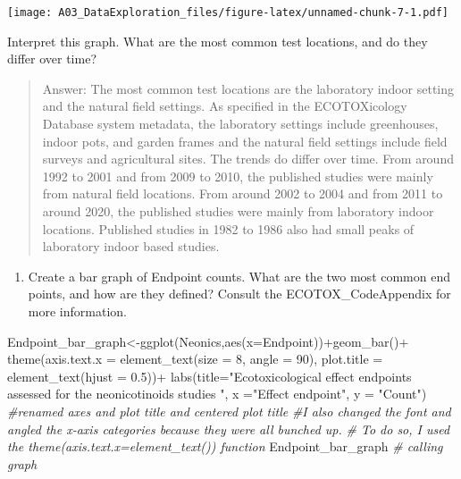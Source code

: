 \documentclass[
]{article}
\newenvironment{Shaded}{\begin{snugshade}}{\end{snugshade}}
\newcommand{\AttributeTok}[1]{\textcolor[rgb]{0.77,0.63,0.00}{#1}}
\newcommand{\CommentTok}[1]{\textcolor[rgb]{0.56,0.35,0.01}{\textit{#1}}}
\newcommand{\DecValTok}[1]{\textcolor[rgb]{0.00,0.00,0.81}{#1}}
\newcommand{\FloatTok}[1]{\textcolor[rgb]{0.00,0.00,0.81}{#1}}
\newcommand{\FunctionTok}[1]{\textcolor[rgb]{0.00,0.00,0.00}{#1}}
\newcommand{\NormalTok}[1]{#1}
\newcommand{\OtherTok}[1]{\textcolor[rgb]{0.56,0.35,0.01}{#1}}
\newcommand{\SpecialCharTok}[1]{\textcolor[rgb]{0.00,0.00,0.00}{#1}}
\newcommand{\StringTok}[1]{\textcolor[rgb]{0.31,0.60,0.02}{#1}}
\providecommand{\tightlist}{%
  \setlength{\itemsep}{0pt}\setlength{\parskip}{0pt}}
\begin{document}
\texttt{[image: A03\_DataExploration\_files/figure-latex/unnamed-chunk-7-1.pdf]}

Interpret this graph. What are the most common test locations, and do
they differ over time?

\begin{quote}
Answer: The most common test locations are the laboratory indoor setting
and the natural field settings. As specified in the ECOTOXicology
Database system metadata, the laboratory settings include greenhouses,
indoor pots, and garden frames and the natural field settings include
field surveys and agricultural sites. The trends do differ over time.
From around 1992 to 2001 and from 2009 to 2010, the published studies
were mainly from natural field locations. From around 2002 to 2004 and
from 2011 to around 2020, the published studies were mainly from
laboratory indoor locations. Published studies in 1982 to 1986 also had
small peaks of laboratory indoor based studies.
\end{quote}

\begin{enumerate}
\def\labelenumi{\arabic{enumi}.}
\setcounter{enumi}{10}
\tightlist
\item
  Create a bar graph of Endpoint counts. What are the two most common
  end points, and how are they defined? Consult the ECOTOX\_CodeAppendix
  for more information.
\end{enumerate}

\begin{Shaded}
\begin{Highlighting}[]
\NormalTok{Endpoint\_bar\_graph}\OtherTok{\textless{}{-}}\FunctionTok{ggplot}\NormalTok{(Neonics,}\FunctionTok{aes}\NormalTok{(}\AttributeTok{x=}\NormalTok{Endpoint))}\SpecialCharTok{+}\FunctionTok{geom\_bar}\NormalTok{()}\SpecialCharTok{+}
  \FunctionTok{theme}\NormalTok{(}\AttributeTok{axis.text.x =} \FunctionTok{element\_text}\NormalTok{(}\AttributeTok{size =} \DecValTok{8}\NormalTok{, }\AttributeTok{angle =} \DecValTok{90}\NormalTok{),}
        \AttributeTok{plot.title =} \FunctionTok{element\_text}\NormalTok{(}\AttributeTok{hjust =} \FloatTok{0.5}\NormalTok{))}\SpecialCharTok{+}
  \FunctionTok{labs}\NormalTok{(}\AttributeTok{title=}\StringTok{"Ecotoxicological effect endpoints assessed for the neonicotinoids studies "}\NormalTok{,}
  \AttributeTok{x =}\StringTok{"Effect endpoint"}\NormalTok{, }\AttributeTok{y =} \StringTok{"Count"}\NormalTok{)}
\CommentTok{\#renamed axes and plot title and centered plot title}
\CommentTok{\#I also changed the font and angled the x{-}axis categories because they were all bunched up.}
\CommentTok{\# To do so, I used the theme(axis.text.x=element\_text()) function}
\NormalTok{Endpoint\_bar\_graph }\CommentTok{\# calling graph}
\end{Highlighting}
\end{Shaded}
\end{document}
